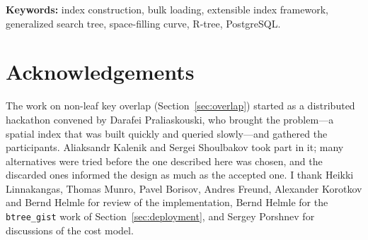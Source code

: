 \documentclass[11pt, a4paper]{article}
\newcommand{\code}[1]{\texttt{#1}}
\begin{document}
\vspace{4pt}
\noindent\textbf{Keywords:} index construction, bulk loading, extensible index
framework, generalized search tree, space-filling curve, R-tree, PostgreSQL.




\section*{Acknowledgements}

The work on non-leaf key overlap (Section~\ref{sec:overlap}) started as a
distributed hackathon convened by Darafei Praliaskouski, who brought the
problem---a spatial index that was built quickly and queried slowly---and
gathered the participants. Aliaksandr Kalenik and Sergei Shoulbakov took part in
it; many alternatives were tried before the one described here was chosen, and
the discarded ones informed the design as much as the accepted one. I thank
Heikki Linnakangas, Thomas Munro, Pavel Borisov, Andres Freund, Alexander
Korotkov and Bernd Helmle for review of the implementation, Bernd Helmle for the
\code{btree\_gist} work of Section~\ref{sec:deployment}, and Sergey Porshnev for
discussions of the cost model.



\end{document}
